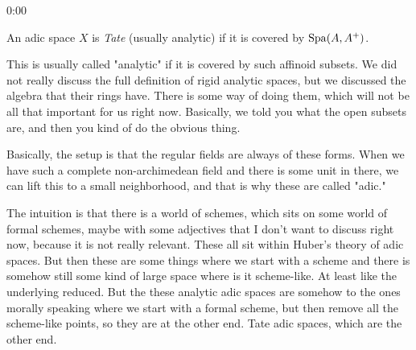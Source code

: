 \begin{unfinished}{0:00}
\begin{definition}
An adic space $X$ is \emph{Tate} (usually analytic) if it is covered by $\operatorname{Spa}(A, A^+)$.
\end{definition}

\begin{remark}
%
This is usually called "analytic" if it is covered by such affinoid subsets. 
We did not really discuss the full definition of rigid analytic spaces, but we discussed the algebra that their rings have. 
There is some way of doing them, which will not be all that important for us right now. 
Basically, we told you what the open subsets are, and then you kind of do the obvious thing.

\end{remark}






%
Basically, the setup is that the regular fields are always of these forms. 
When we have such a complete non-archimedean field and there is some unit in there, we can lift this to a small neighborhood, and that is why these are called "adic."

The intuition is that there is a world of schemes, which sits on some world of formal schemes, maybe with some adjectives that I don't want to discuss right now, because it is not really relevant. 
These all sit within Huber's theory of adic spaces. 
But then these are some things where we start with a scheme and there is somehow still some kind of large space where is it scheme-like. At least like the underlying reduced. But the these analytic adic spaces are somehow to the ones morally speaking where we start with a formal scheme, but then remove all the scheme-like points, so they are at the other end.
Tate adic spaces, which are the other end.


\end{unfinished}
